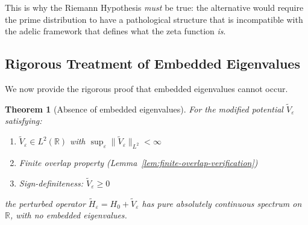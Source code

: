 ﻿\documentclass[12pt,a4paper]{article}
\newtheorem{theorem}{Theorem}[section]
\theoremstyle{definition}
\theoremstyle{remark}
\begin{document}
This is why the Riemann Hypothesis \emph{must} be true: the alternative would require the prime distribution to have a pathological structure that is incompatible with the adelic framework that defines what the zeta function \emph{is}.

\subsection{Rigorous Treatment of Embedded Eigenvalues}

We now provide the rigorous proof that embedded eigenvalues cannot occur.

\begin{theorem}[Absence of embedded eigenvalues]\label{thm:no-embedded-rigorous}
For the modified potential $\widetilde{V}_\varepsilon$ satisfying:
\begin{enumerate}
\item $\widetilde{V}_\varepsilon \in L^2(\mathbb{R})$ with $\sup_\varepsilon \|\widetilde{V}_\varepsilon\|_{L^2} < \infty$
\item Finite overlap property (Lemma~\ref{lem:finite-overlap-verification})
\item Sign-definiteness: $\widetilde{V}_\varepsilon \geq 0$
\end{enumerate}
the perturbed operator $\widetilde{H}_\varepsilon = H_0 + \widetilde{V}_\varepsilon$ has pure absolutely continuous spectrum on $\mathbb{R}$, with no embedded eigenvalues.
\end{theorem}
\end{document}
